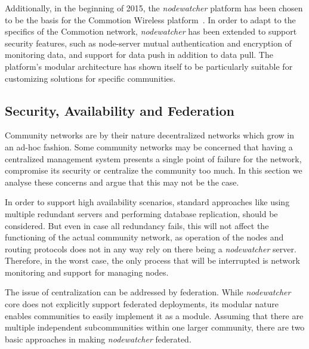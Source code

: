 \documentclass[5p,sort&compress]{elsarticle}
\newcommand{\nodewatcher}{\textit{nodewatcher}}
\begin{document}
Additionally, in the beginning of 2015, the \nodewatcher{} platform has been chosen to be the basis for the Commotion Wireless platform~\cite{Commotion_2015}.
In order to adapt to the specifics of the Commotion network, \nodewatcher{} has been extended to support security features, such as node-server mutual authentication and encryption of monitoring data, and support for data push in addition to data pull.
The platform's modular architecture has shown itself to be particularly suitable for customizing solutions for specific communities.

\subsection{Security, Availability and Federation}

Community networks are by their nature decentralized networks which grow in an ad-hoc fashion.
Some community networks may be concerned that having a centralized management system presents a single point of failure for the network, compromise its security or centralize the community too much.
In this section we analyse these concerns and argue that this may not be the case.

In order to support high availability scenarios, standard approaches like using multiple redundant servers and performing database replication, should be considered.
But even in case all redundancy fails, this will not affect the functioning of the actual community network, as operation of the nodes and routing protocols does not in any way rely on there being a \nodewatcher{} server.
Therefore, in the worst case, the only process that will be interrupted is network monitoring and support for managing nodes.

The issue of centralization can be addressed by federation. 
While \nodewatcher{} core does not explicitly support federated deployments, its modular nature enables communities to easily implement it as a module.
Assuming that there are multiple independent subcommunities within one larger community, there are two basic approaches in making \nodewatcher{} federated.
\end{document}
